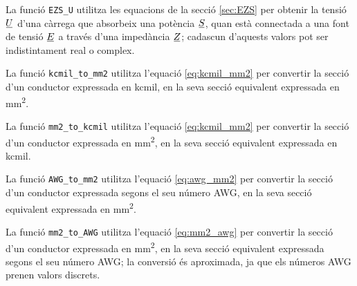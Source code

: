 


La funció \texttt{EZS\_U} utilitza les equacions de la secció \vref{sec:EZS} per obtenir la tensió $\cmplx{U}$ d'una càrrega que absorbeix una potència $\cmplx{S}$, quan està connectada a una font de tensió $\cmplx{E}$ a través d'una impedància $\cmplx{Z}$; cadascun d'aquests valors pot ser indistintament real o complex.




La funció \texttt{kcmil\_to\_mm2} utilitza l'equació \eqref{eq:kcmil_mm2} per convertir la secció d'un conductor expressada en \unit{kcmil}, en la seva secció equivalent expressada en \unit{mm^2}.




La funció \texttt{mm2\_to\_kcmil} utilitza l'equació \eqref{eq:kcmil_mm2} per convertir la secció d'un conductor expressada en \unit{mm^2}, en la seva secció equivalent expressada en \unit{kcmil}.




La funció \texttt{AWG\_to\_mm2} utilitza l'equació \eqref{eq:awg_mm2} per convertir la secció d'un conductor expressada segons el seu número AWG, en la seva secció equivalent expressada en \unit{mm^2}.




La funció \texttt{mm2\_to\_AWG} utilitza l'equació \eqref{eq:mm2_awg} per convertir la secció d'un conductor expressada en \unit{mm^2}, en la seva secció equivalent expressada segons el seu número AWG; la conversió és aproximada, ja que els números AWG prenen valors discrets.




